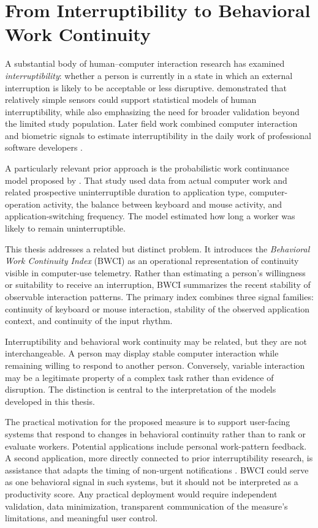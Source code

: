 \section{From Interruptibility to Behavioral Work Continuity}

A substantial body of human--computer interaction research has examined \emph{interruptibility}: whether a person is currently in a state in which an external interruption is likely to be acceptable or less disruptive. \textcite{fogarty2005interruptibility} demonstrated that relatively simple sensors could support statistical models of human interruptibility, while also emphasizing the need for broader validation beyond the limited study population. Later field work combined computer interaction and biometric signals to estimate interruptibility in the daily work of professional software developers \parencite{zueger2018sensing}.

A particularly relevant prior approach is the probabilistic work continuance
model proposed by \textcite{shiratori2020workContinuance}. That study used data from actual computer work and related prospective uninterruptible duration to application type, computer-operation activity, the balance between keyboard and mouse activity, and application-switching frequency. The model estimated how long a worker was likely to remain uninterruptible. 

This thesis addresses a related but distinct problem. It introduces the \emph{Behavioral Work Continuity Index} (BWCI) as an operational representation of continuity visible in computer-use telemetry. Rather than estimating a person's willingness or suitability to receive an interruption, BWCI summarizes the recent stability of observable interaction patterns. The primary index combines three signal families: continuity of keyboard or mouse interaction, stability of the observed application context, and continuity of the input rhythm. 

Interruptibility and behavioral work continuity may be related, but they are not interchangeable. A person may display stable computer interaction while remaining willing to respond to another person. Conversely, variable interaction may be a legitimate property of a complex task rather than evidence of disruption. The distinction is central to the interpretation of the models developed in this thesis.

The practical motivation for the proposed measure is to support user-facing systems that respond to changes in behavioral continuity rather than to rank or evaluate workers. Potential applications include personal work-pattern feedback. A second application, more directly connected to prior interruptibility research, is assistance that adapts the timing of non-urgent notifications \parencite{fogarty2005interruptibility,zueger2018sensing,
shiratori2020workContinuance}. BWCI could serve as one behavioral signal in such systems, but it should not be interpreted as a productivity score. Any practical deployment would require independent validation, data minimization, transparent communication of the measure's limitations, and meaningful user control.

